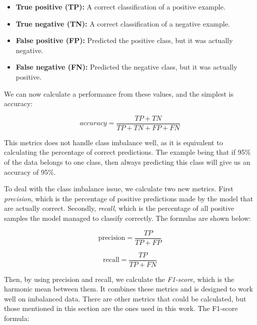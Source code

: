         \begin{itemize}
            \item \textbf{True positive (TP):} A correct classification of a positive example.
            \item \textbf{True negative (TN):} A correct classification of a negative example.
            \item \textbf{False positive (FP):} Predicted the positive class, but it was actually negative.
            \item \textbf{False negative (FN):} Predicted the negative class, but it was actually positive.
            \end{itemize}
        
        We can now calculate a performance from these values, and the simplest is accuracy\cite{powers2020evaluation_f1_recall_precision}:
        
        \begin{equation}
            accuracy = \dfrac{TP+TN}{TP+TN+FP+FN} 
        \end{equation}
        
        This metrics does not handle class imbalance well\cite{powers2020evaluation_f1_recall_precision}, as it is equivalent to calculating the percentage of correct predictions. The example being that if 95\% of the data belongs to one class, then always predicting this class will give us an accuracy of 95\%.
        
        To deal with the class imbalance issue, we calculate two new metrics\cite{powers2020evaluation_f1_recall_precision}. First \textit{precision}, which is the percentage of positive predictions made by the model that are actually correct. Secondly, \textit{recall}, which is the percentage of all positive samples the model managed to classify correctly. The formulas are shown below:
        
        \begin{equation}
            \textrm{precision} = \dfrac{TP}{TP+FP}
        \end{equation}
        
        \begin{equation}
            \textrm{recall} = \dfrac{TP}{TP+FN}
        \end{equation}
        
        Then, by using precision and recall, we calculate the \textit{F1-score}, which is the harmonic mean between them\cite{powers2020evaluation_f1_recall_precision}. It combines these metrics and is designed to work well on imbalanced data. There are other metrics that could be calculated, but those mentioned in this section are the ones used in this work. The F1-score formula:
        
